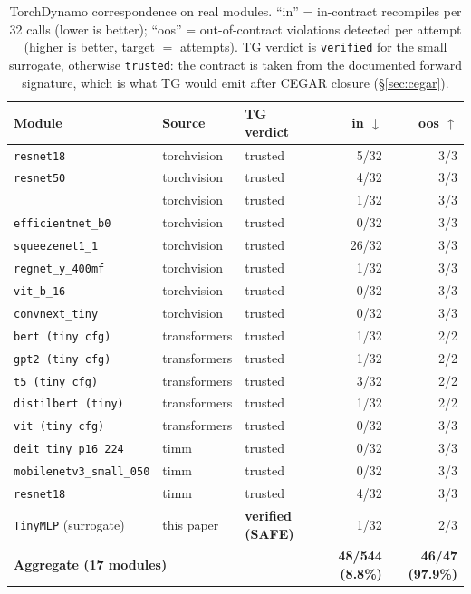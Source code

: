 \begin{table}[t]
\centering
\small
\caption{TorchDynamo correspondence on real modules. ``in'' = in-contract
recompiles per 32 calls (lower is better); ``oos'' = out-of-contract
violations detected per attempt (higher is better, target $=$ attempts).
TG verdict is \texttt{verified} for the small surrogate, otherwise
\texttt{trusted}: the contract is taken from the documented forward
signature, which is what TG would emit after CEGAR closure
(\S\ref{sec:cegar}).}
\label{tab:dynamo}
\begin{tabular}{lllrr}
\toprule
Module & Source & TG verdict & in $\downarrow$ & oos $\uparrow$ \\
\midrule
\texttt{resnet18} & torchvision & trusted & 5/32 & 3/3 \\
\texttt{resnet50} & torchvision & trusted & 4/32 & 3/3 \\
 & torchvision & trusted & 1/32 & 3/3 \\
\texttt{efficientnet\_b0} & torchvision & trusted & 0/32 & 3/3 \\
\texttt{squeezenet1\_1} & torchvision & trusted & 26/32 & 3/3 \\
\texttt{regnet\_y\_400mf} & torchvision & trusted & 1/32 & 3/3 \\
\texttt{vit\_b\_16} & torchvision & trusted & 0/32 & 3/3 \\
\texttt{convnext\_tiny} & torchvision & trusted & 0/32 & 3/3 \\
\texttt{bert (tiny cfg)} & transformers & trusted & 1/32 & 2/2 \\
\texttt{gpt2 (tiny cfg)} & transformers & trusted & 1/32 & 2/2 \\
\texttt{t5 (tiny cfg)} & transformers & trusted & 3/32 & 2/2 \\
\texttt{distilbert (tiny)} & transformers & trusted & 1/32 & 2/2 \\
\texttt{vit (tiny cfg)} & transformers & trusted & 0/32 & 3/3 \\
\texttt{deit\_tiny\_p16\_224} & timm & trusted & 0/32 & 3/3 \\
\texttt{mobilenetv3\_small\_050} & timm & trusted & 0/32 & 3/3 \\
\texttt{resnet18} & timm & trusted & 4/32 & 3/3 \\
\texttt{TinyMLP} (surrogate) & this paper & \textbf{verified (SAFE)} & 1/32 & 2/3 \\
\midrule
\multicolumn{3}{l}{\textbf{Aggregate (17 modules)}} & \textbf{48/544 (8.8\%)} & \textbf{46/47 (97.9\%)} \\
\bottomrule
\end{tabular}
\end{table}

